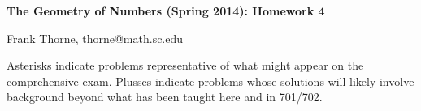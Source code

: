\documentclass[12pt]{article}
\begin{document}
\setlength{\topmargin}{-2mm}





\begin{center}{\bf The Geometry of Numbers (Spring 2014): Homework 4}
\end{center}
\begin{center}Frank Thorne, thorne@math.sc.edu
\end{center}

Asterisks indicate problems representative of what might appear on the comprehensive exam.
Plusses indicate problems whose solutions will likely involve background beyond what has been taught here
and in 701/702.
\\
\\
\end{document}
